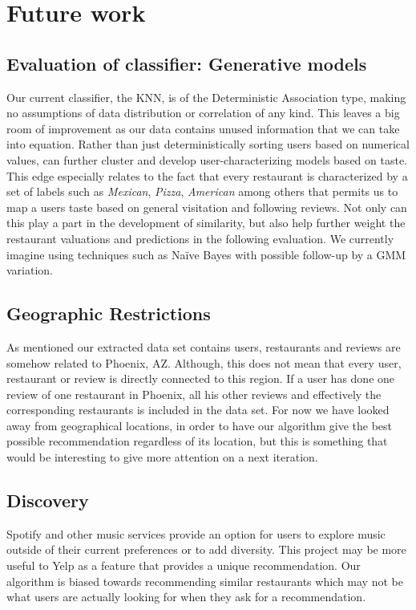 \documentclass[10pt,twocolumn,letterpaper]{article}
\begin{document}
\section{Future work}

\subsection{Evaluation of classifier: Generative models}
Our current classifier, the KNN, is of the Deterministic Association type, making no assumptions of data distribution or correlation of any kind. This leaves a big room of improvement as our data contains unused information that we can take into equation. Rather than just deterministically sorting users based on numerical values, can further cluster and develop user-characterizing models based on taste. This edge especially relates to the fact that every restaurant is characterized by a set of labels such as \textit{Mexican}, \textit{Pizza}, \textit{American} among others that permits us to map a users taste based on general visitation and following reviews. Not only can this play a part in the development of similarity, but also help further weight the restaurant valuations and predictions in the following evaluation. We currently imagine using techniques such as Naïve Bayes with possible follow-up by a GMM variation.

\subsection{Geographic Restrictions}
As mentioned our extracted data set contains users, restaurants and reviews are somehow related to Phoenix, AZ. Although, this does not mean that every user, restaurant or review is directly connected to this region. If a user has done one review of one restaurant in Phoenix, all his other reviews and effectively the corresponding restaurants is included in the data set. For now we have looked away from geographical locations, in order to have our algorithm give the best possible recommendation regardless of its location, but this is something that would be interesting to give more attention on a next iteration.

\subsection{Discovery}
Spotify and other music services provide an option for users to explore music outside of their current preferences or to add diversity. This project may be more useful to Yelp as a feature that provides a unique recommendation. Our algorithm is biased towards recommending similar restaurants which may not be what users are actually looking for when they ask for a recommendation.


{\small

}
\end{document}
